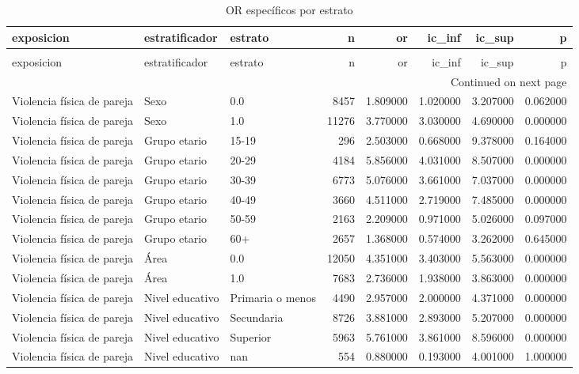 \begin{longtable}{lllrrrrr}
\caption{OR específicos por estrato} \label{tab:tabla_15_or_por_estrato} \\
\toprule
exposicion & estratificador & estrato & n & or & ic\_inf & ic\_sup & p \\
\midrule
\endfirsthead
\caption[]{OR específicos por estrato} \\
\toprule
exposicion & estratificador & estrato & n & or & ic\_inf & ic\_sup & p \\
\midrule
\endhead
\midrule
\multicolumn{8}{r}{Continued on next page} \\
\midrule
\endfoot
\bottomrule
\endlastfoot
Violencia física de pareja & Sexo & 0.0 & 8457 & 1.809000 & 1.020000 & 3.207000 & 0.062000 \\
Violencia física de pareja & Sexo & 1.0 & 11276 & 3.770000 & 3.030000 & 4.690000 & 0.000000 \\
Violencia física de pareja & Grupo etario & 15-19 & 296 & 2.503000 & 0.668000 & 9.378000 & 0.164000 \\
Violencia física de pareja & Grupo etario & 20-29 & 4184 & 5.856000 & 4.031000 & 8.507000 & 0.000000 \\
Violencia física de pareja & Grupo etario & 30-39 & 6773 & 5.076000 & 3.661000 & 7.037000 & 0.000000 \\
Violencia física de pareja & Grupo etario & 40-49 & 3660 & 4.511000 & 2.719000 & 7.485000 & 0.000000 \\
Violencia física de pareja & Grupo etario & 50-59 & 2163 & 2.209000 & 0.971000 & 5.026000 & 0.097000 \\
Violencia física de pareja & Grupo etario & 60+ & 2657 & 1.368000 & 0.574000 & 3.262000 & 0.645000 \\
Violencia física de pareja & Área & 0.0 & 12050 & 4.351000 & 3.403000 & 5.563000 & 0.000000 \\
Violencia física de pareja & Área & 1.0 & 7683 & 2.736000 & 1.938000 & 3.863000 & 0.000000 \\
Violencia física de pareja & Nivel educativo & Primaria o menos & 4490 & 2.957000 & 2.000000 & 4.371000 & 0.000000 \\
Violencia física de pareja & Nivel educativo & Secundaria & 8726 & 3.881000 & 2.893000 & 5.207000 & 0.000000 \\
Violencia física de pareja & Nivel educativo & Superior & 5963 & 5.761000 & 3.861000 & 8.596000 & 0.000000 \\
Violencia física de pareja & Nivel educativo & nan & 554 & 0.880000 & 0.193000 & 4.001000 & 1.000000 \\

\end{longtable}
